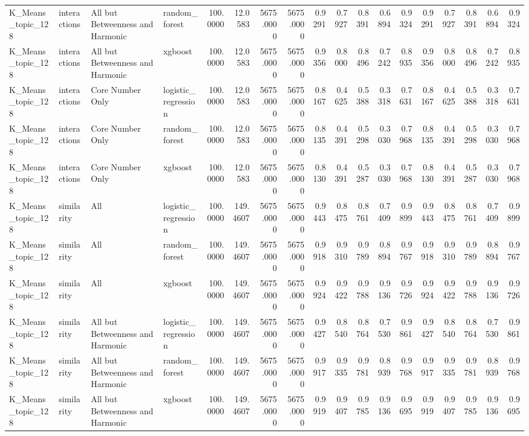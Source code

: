 \begin{tabular}{llllrrrrrrrrrrrrrr}
K_Means_topic_128 & interactions & All but Betweenness and Harmonic & random_forest & 100.0000 & 12.0583 & 5675.0000 & 5675.0000 & 0.9291 & 0.7927 & 0.8391 & 0.6894 & 0.9324 & 0.9291 & 0.7927 & 0.8391 & 0.6894 & 0.9324 \\
K_Means_topic_128 & interactions & All but Betweenness and Harmonic & xgboost & 100.0000 & 12.0583 & 5675.0000 & 5675.0000 & 0.9356 & 0.8000 & 0.8496 & 0.7242 & 0.8935 & 0.9356 & 0.8000 & 0.8496 & 0.7242 & 0.8935 \\
K_Means_topic_128 & interactions & Core Number Only & logistic_regression & 100.0000 & 12.0583 & 5675.0000 & 5675.0000 & 0.8167 & 0.4625 & 0.5388 & 0.3318 & 0.7631 & 0.8167 & 0.4625 & 0.5388 & 0.3318 & 0.7631 \\
K_Means_topic_128 & interactions & Core Number Only & random_forest & 100.0000 & 12.0583 & 5675.0000 & 5675.0000 & 0.8135 & 0.4391 & 0.5298 & 0.3030 & 0.7968 & 0.8135 & 0.4391 & 0.5298 & 0.3030 & 0.7968 \\
K_Means_topic_128 & interactions & Core Number Only & xgboost & 100.0000 & 12.0583 & 5675.0000 & 5675.0000 & 0.8130 & 0.4391 & 0.5287 & 0.3030 & 0.7968 & 0.8130 & 0.4391 & 0.5287 & 0.3030 & 0.7968 \\
K_Means_topic_128 & similarity & All & logistic_regression & 100.0000 & 149.4607 & 5675.0000 & 5675.0000 & 0.9443 & 0.8475 & 0.8761 & 0.7409 & 0.9899 & 0.9443 & 0.8475 & 0.8761 & 0.7409 & 0.9899 \\
K_Means_topic_128 & similarity & All & random_forest & 100.0000 & 149.4607 & 5675.0000 & 5675.0000 & 0.9918 & 0.9310 & 0.9789 & 0.8894 & 0.9767 & 0.9918 & 0.9310 & 0.9789 & 0.8894 & 0.9767 \\
K_Means_topic_128 & similarity & All & xgboost & 100.0000 & 149.4607 & 5675.0000 & 5675.0000 & 0.9924 & 0.9422 & 0.9788 & 0.9136 & 0.9726 & 0.9924 & 0.9422 & 0.9788 & 0.9136 & 0.9726 \\
K_Means_topic_128 & similarity & All but Betweenness and Harmonic & logistic_regression & 100.0000 & 149.4607 & 5675.0000 & 5675.0000 & 0.9427 & 0.8540 & 0.8764 & 0.7530 & 0.9861 & 0.9427 & 0.8540 & 0.8764 & 0.7530 & 0.9861 \\
K_Means_topic_128 & similarity & All but Betweenness and Harmonic & random_forest & 100.0000 & 149.4607 & 5675.0000 & 5675.0000 & 0.9917 & 0.9335 & 0.9781 & 0.8939 & 0.9768 & 0.9917 & 0.9335 & 0.9781 & 0.8939 & 0.9768 \\
K_Means_topic_128 & similarity & All but Betweenness and Harmonic & xgboost & 100.0000 & 149.4607 & 5675.0000 & 5675.0000 & 0.9919 & 0.9407 & 0.9785 & 0.9136 & 0.9695 & 0.9919 & 0.9407 & 0.9785 & 0.9136 & 0.9695 \\

\end{tabular}
